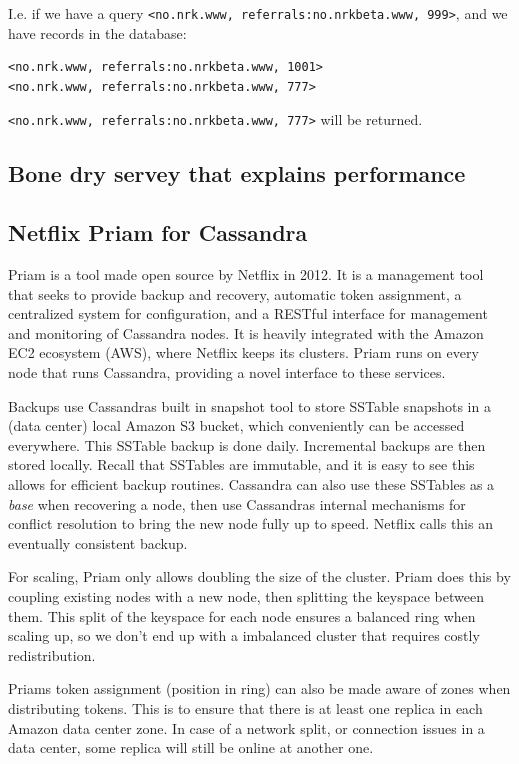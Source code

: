 I.e. if we have a query \texttt{<no.nrk.www, referrals:no.nrkbeta.www, 999>}, and we have records in the database:
\begin{lstlisting}
<no.nrk.www, referrals:no.nrkbeta.www, 1001>
<no.nrk.www, referrals:no.nrkbeta.www, 777>
\end{lstlisting}
\texttt{<no.nrk.www, referrals:no.nrkbeta.www, 777>} will be returned.

\subsection{Bone dry servey that explains performance}

\subsection{Netflix Priam for Cassandra}
Priam is a tool made open source by Netflix in 2012. It is a management tool that seeks to provide backup and recovery, automatic token assignment, a centralized system for configuration, and a RESTful interface for management and monitoring of Cassandra nodes. It is heavily integrated with the Amazon EC2 ecosystem (AWS), where Netflix keeps its clusters.
Priam runs on every node that runs Cassandra, providing a novel interface to these services.

Backups use Cassandras built in snapshot tool to store SSTable snapshots in a (data center) local Amazon S3 bucket, which conveniently can be accessed everywhere.
This SSTable backup is done daily. Incremental backups are then stored locally. Recall that SSTables are immutable, and it is easy to see this allows for efficient backup routines. Cassandra can also use these SSTables as a \emph{base} when recovering a node, then use Cassandras internal mechanisms for conflict resolution to bring the new node fully up to speed. Netflix calls this an eventually consistent backup.

For scaling, Priam only allows doubling the size of the cluster. Priam does this by coupling existing nodes with a new node, then splitting the keyspace between them. This split of the keyspace for each node ensures a balanced ring when scaling up, so we don't end up with a imbalanced cluster that requires costly redistribution.

Priams token assignment (position in ring) can also be made aware of zones when distributing tokens. This is to ensure that there is at least one replica in each Amazon data center zone. In case of a network split, or connection issues in a data center, some replica will still be online at another one.

